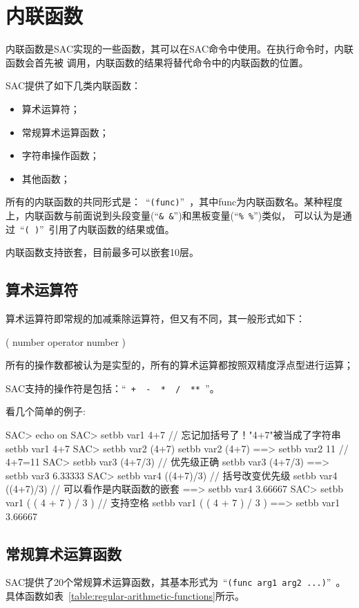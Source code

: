 \section{内联函数}

内联函数是SAC实现的一些函数，其可以在SAC命令中使用。在执行命令时，内联函数会首先被
调用，内联函数的结果将替代命令中的内联函数的位置。

SAC提供了如下几类内联函数：
\begin{itemize}
\item 算术运算符；
\item 常规算术运算函数；
\item 字符串操作函数；
\item 其他函数；
\end{itemize}

所有的内联函数的共同形式是：~``\verb+(func)+''~，其中func为内联函数名。某种程度
上，内联函数与前面说到头段变量(``\verb+& &+'')和黑板变量(``\verb+% %+'')类似，
可以认为是通过~``\verb+( )+''~引用了内联函数的结果或值。

内联函数支持嵌套，目前最多可以嵌套10层。

\subsection{算术运算符}
算术运算符即常规的加减乘除运算符，但又有不同，其一般形式如下：
\begin{SACCode}
    ( number operator number )
\end{SACCode}
所有的操作数都被认为是实型的，所有的算术运算都按照双精度浮点型进行运算；

SAC支持的操作符是包括：``\verb| +  -  *  /  ** |''。

看几个简单的例子:
\begin{SACCode}
SAC> echo on
SAC> setbb var1 4+7             // 忘记加括号了！"4+7"被当成了字符串
 setbb var1 4+7
SAC> setbb var2 (4+7)
 setbb var2 (4+7)
 ==>  setbb var2 11             // 4+7=11
SAC> setbb var3 (4+7/3)         // 优先级正确
 setbb var3 (4+7/3)
 ==>  setbb var3 6.33333
SAC> setbb var4 ((4+7)/3)       // 括号改变优先级
 setbb var4 ((4+7)/3)           // 可以看作是内联函数的嵌套
 ==>  setbb var4 3.66667
SAC> setbb var1 ( ( 4 + 7 ) / 3 )   // 支持空格
 setbb var1 ( ( 4 + 7 ) / 3 )
 ==>  setbb var1 3.66667
\end{SACCode}

\subsection{常规算术运算函数}
SAC提供了20个常规算术运算函数，其基本形式为~``\verb+(func arg1 arg2 ...)+''~。
具体函数如表~\ref{table:regular-arithmetic-functions}所示。

